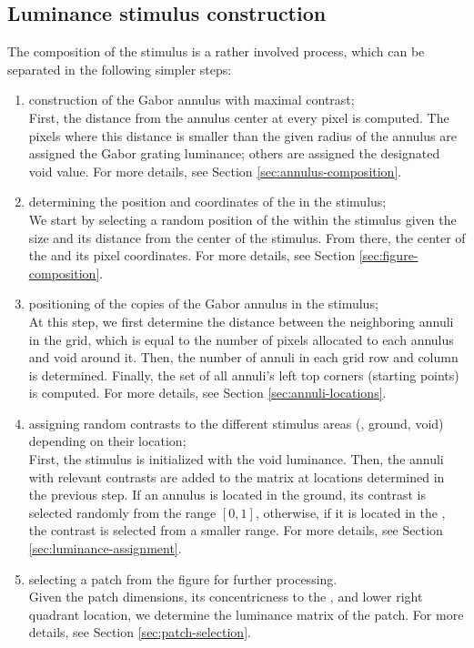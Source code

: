 \subsection{Luminance stimulus construction}

The composition of the stimulus is a rather involved process, which can be separated in the following simpler steps:
\begin{enumerate}
    \item construction of the Gabor annulus with maximal contrast; \\
    First, the distance from the annulus center at every pixel is computed. The pixels where this distance is smaller than the given radius of the annulus are assigned the Gabor grating luminance; others are assigned the designated void value. For more details, see Section \ref{sec:annulus-composition}.
    
    \item determining the position and coordinates of the \stimfig{} in the stimulus; \\
    We start by selecting a random position of the \stimfig{} within the stimulus given the \stimfig{} size and its distance from the center of the stimulus. From there, the center of the \stimfig{} and its pixel coordinates. For more details, see Section \ref{sec:figure-composition}.
    
    \item positioning of the copies of the Gabor annulus in the stimulus; \\
    At this step, we first determine the distance between the neighboring annuli in the grid, which is equal to the number of pixels allocated to each annulus and void around it. Then, the number of annuli in each grid row and column is determined. Finally, the set of all annuli's left top corners (starting points) is computed. For more details, see Section \ref{sec:annuli-locations}.
    
    \item assigning random contrasts to the different stimulus areas (\stimfig, ground, void) depending on their location; \\
    First, the stimulus is initialized with the void luminance. Then, the annuli with relevant contrasts are added to the matrix at locations determined in the previous step. If an annulus is located in the
    ground, its contrast is selected randomly from the range $[0, 1]$, otherwise, if it is located in the \stimfig, the contrast is selected from a smaller range. For more details, see Section \ref{sec:luminance-assignment}.
    
    \item selecting a patch from the figure for further processing. \\
    Given the patch dimensions, its concentricness to the \stimfig, and lower right quadrant location, we determine the luminance matrix of the patch.
    For more details, see Section \ref{sec:patch-selection}.
\end{enumerate}

